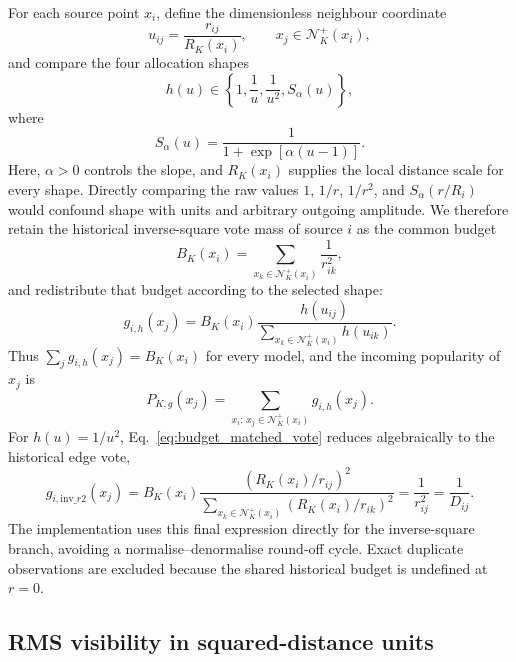 \documentclass[pdflatex,sn-mathphys-num]{sn-jnl}
\newcommand{\calN}{\mathcal{N}}
\begin{document}
For each source point $x_i$, define the dimensionless neighbour coordinate
\begin{equation}
u_{ij}=\frac{r_{ij}}{R_K(x_i)},
\qquad x_j\in\calN_K^+(x_i),
\label{eq:normalised_neighbour_distance}
\end{equation}
and compare the four allocation shapes
\begin{equation}
h(u)\in
\left\{
1,\frac{1}{u},\frac{1}{u^2},S_\alpha(u)
\right\},
\label{eq:vote_kernel_family}
\end{equation}
where
\begin{equation}
S_\alpha(u)=\frac{1}{1+\exp[\alpha(u-1)]}.
\label{eq:sigmoid_vote}
\end{equation}
Here, $\alpha>0$ controls the slope, and $R_K(x_i)$ supplies the local distance scale for every shape.  Directly comparing the raw values $1$, $1/r$, $1/r^2$, and $S_\alpha(r/R_i)$ would confound shape with units and arbitrary outgoing amplitude.  We therefore retain the historical inverse-square vote mass of source $i$ as the common budget
\begin{equation}
B_K(x_i)=\sum_{x_k\in\calN_K^+(x_i)}\frac{1}{r_{ik}^2},
\label{eq:historical_source_budget}
\end{equation}
and redistribute that budget according to the selected shape:
\begin{equation}
g_{i,h}(x_j)=B_K(x_i)
\frac{h(u_{ij})}
{\displaystyle\sum_{x_k\in\calN_K^+(x_i)}h(u_{ik})}.
\label{eq:budget_matched_vote}
\end{equation}
Thus $\sum_j g_{i,h}(x_j)=B_K(x_i)$ for every model, and the incoming popularity of $x_j$ is
\begin{equation}
P_{K,g}(x_j)=
\sum_{x_i:\,x_j\in\calN_K^+(x_i)}g_{i,h}(x_j).
\label{eq:reverse_popularity}
\end{equation}
For $h(u)=1/u^2$, Eq.~\eqref{eq:budget_matched_vote} reduces algebraically to the historical edge vote,
\begin{equation}
g_{i,\mathrm{inv}\_r2}(x_j)
=B_K(x_i)\frac{(R_K(x_i)/r_{ij})^2}
{\sum_{x_k\in\calN_K^+(x_i)}(R_K(x_i)/r_{ik})^2}
=\frac{1}{r_{ij}^2}=\frac{1}{D_{ij}}.
\label{eq:historical_reverse_popularity}
\end{equation}
The implementation uses this final expression directly for the inverse-square branch, avoiding a normalise--denormalise round-off cycle. Exact duplicate observations are excluded because the shared historical budget is undefined at $r=0$.

\subsection{RMS visibility in squared-distance units}
\end{document}
